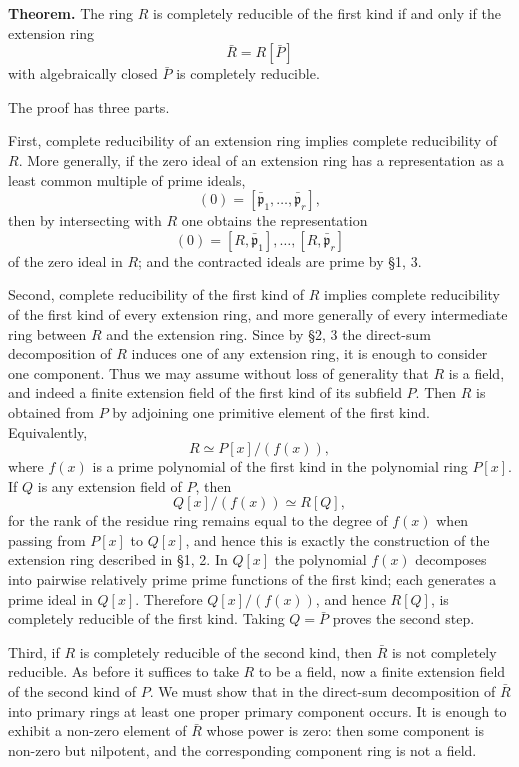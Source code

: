 \documentclass[
  12pt,
]{article}
\begin{document}
\textbf{Theorem.} The ring \(R\) is completely reducible of the first
kind if and only if the extension ring \[
  \bar R=R[\bar P]
\] with algebraically closed \(\bar P\) is completely reducible.

The proof has three parts.

First, complete reducibility of an extension ring implies complete
reducibility of \(R\). More generally, if the zero ideal of an extension
ring has a representation as a least common multiple of prime ideals, \[
  (0)=[\bar{\mathfrak p}_1,
\ldots,\bar{\mathfrak p}_r],
\] then by intersecting with \(R\) one obtains the representation \[
  (0)=[R,\bar{\mathfrak p}_1],
\ldots,[R,\bar{\mathfrak p}_r]
\] of the zero ideal in \(R\); and the contracted ideals are prime by
§1, 3.

Second, complete reducibility of the first kind of \(R\) implies
complete reducibility of the first kind of every extension ring, and
more generally of every intermediate ring between \(R\) and the
extension ring. Since by §2, 3 the direct-sum decomposition of \(R\)
induces one of any extension ring, it is enough to consider one
component. Thus we may assume without loss of generality that \(R\) is a
field, and indeed a finite extension field of the first kind of its
subfield \(P\). Then \(R\) is obtained from \(P\) by adjoining one
primitive element of the first kind. Equivalently, \[
  R\simeq P[x]/(f(x)),
\] where \(f(x)\) is a prime polynomial of the first kind in the
polynomial ring \(P[x]\). If \(Q\) is any extension field of \(P\), then
\[
  Q[x]/(f(x))\simeq R[Q],
\] for the rank of the residue ring remains equal to the degree of
\(f(x)\) when passing from \(P[x]\) to \(Q[x]\), and hence this is
exactly the construction of the extension ring described in §1, 2. In
\(Q[x]\) the polynomial \(f(x)\) decomposes into pairwise relatively
prime prime functions of the first kind; each generates a prime ideal in
\(Q[x]\). Therefore \(Q[x]/(f(x))\), and hence \(R[Q]\), is completely
reducible of the first kind. Taking \(Q=\bar P\) proves the second step.

Third, if \(R\) is completely reducible of the second kind, then
\(\bar R\) is not completely reducible. As before it suffices to take
\(R\) to be a field, now a finite extension field of the second kind of
\(P\). We must show that in the direct-sum decomposition of \(\bar R\)
into primary rings at least one proper primary component occurs. It is
enough to exhibit a non-zero element of \(\bar R\) whose power is zero:
then some component is non-zero but nilpotent, and the corresponding
component ring is not a field.
\end{document}
